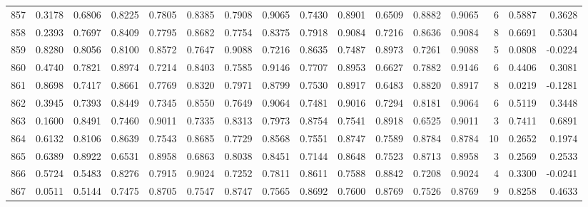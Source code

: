 \begin{tabular}{lrrrrrrrrrrrrrrr}
857 &      0.3178 &  0.6806 &  0.8225 &  0.7805 &  0.8385 &  0.7908 &  0.9065 &  0.7430 &  0.8901 &  0.6509 &   0.8882 &     0.9065 &      6 &                    0.5887 &                     0.3628 \\
858 &      0.2393 &  0.7697 &  0.8409 &  0.7795 &  0.8682 &  0.7754 &  0.8375 &  0.7918 &  0.9084 &  0.7216 &   0.8636 &     0.9084 &      8 &                    0.6691 &                     0.5304 \\
859 &      0.8280 &  0.8056 &  0.8100 &  0.8572 &  0.7647 &  0.9088 &  0.7216 &  0.8635 &  0.7487 &  0.8973 &   0.7261 &     0.9088 &      5 &                    0.0808 &                    -0.0224 \\
860 &      0.4740 &  0.7821 &  0.8974 &  0.7214 &  0.8403 &  0.7585 &  0.9146 &  0.7707 &  0.8953 &  0.6627 &   0.7882 &     0.9146 &      6 &                    0.4406 &                     0.3081 \\
861 &      0.8698 &  0.7417 &  0.8661 &  0.7769 &  0.8320 &  0.7971 &  0.8799 &  0.7530 &  0.8917 &  0.6483 &   0.8820 &     0.8917 &      8 &                    0.0219 &                    -0.1281 \\
862 &      0.3945 &  0.7393 &  0.8449 &  0.7345 &  0.8550 &  0.7649 &  0.9064 &  0.7481 &  0.9016 &  0.7294 &   0.8181 &     0.9064 &      6 &                    0.5119 &                     0.3448 \\
863 &      0.1600 &  0.8491 &  0.7460 &  0.9011 &  0.7335 &  0.8313 &  0.7973 &  0.8754 &  0.7541 &  0.8918 &   0.6525 &     0.9011 &      3 &                    0.7411 &                     0.6891 \\
864 &      0.6132 &  0.8106 &  0.8639 &  0.7543 &  0.8685 &  0.7729 &  0.8568 &  0.7551 &  0.8747 &  0.7589 &   0.8784 &     0.8784 &     10 &                    0.2652 &                     0.1974 \\
865 &      0.6389 &  0.8922 &  0.6531 &  0.8958 &  0.6863 &  0.8038 &  0.8451 &  0.7144 &  0.8648 &  0.7523 &   0.8713 &     0.8958 &      3 &                    0.2569 &                     0.2533 \\
866 &      0.5724 &  0.5483 &  0.8276 &  0.7915 &  0.9024 &  0.7252 &  0.7811 &  0.8611 &  0.7588 &  0.8842 &   0.7208 &     0.9024 &      4 &                    0.3300 &                    -0.0241 \\
867 &      0.0511 &  0.5144 &  0.7475 &  0.8705 &  0.7547 &  0.8747 &  0.7565 &  0.8692 &  0.7600 &  0.8769 &   0.7526 &     0.8769 &      9 &                    0.8258 &                     0.4633 \\

\end{tabular}
